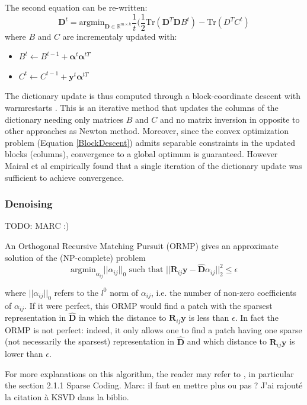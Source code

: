 \documentclass{ipol}
\newcommand{\psize}{m}
\newcommand{\dsize}{k}
\newcommand{\dict}{\textbf{D}}
\newcommand{\code}{\bm{\alpha}}
\newcommand{\noi}{\textbf{y}}
\newcommand{\RR}{\mathbb{R}}
\newcommand{\argmin}{\text{argmin}}
\begin{document}
The second equation can be re-written:
\begin{equation}
	\dict^{t}= \argmin_{\dict \in \RR^{\psize \times \dsize}} \frac{1}{t} (\frac{1}{2} \text{Tr}(\dict^T \dict B^t)- \text{Tr}(D^T C^t )
	\label{BlockDescent}
\end{equation}
where $B$ and $C$ are incrementaly updated with:
\begin{itemize}
	\item $B^t \leftarrow B^{t-1} + \code^t \code^{tT}$
	\item $C^t \leftarrow C^{t-1} + \noi^t \code^{tT}$
\end{itemize}
The dictionary update is thus computed through a block-coordinate descent with warmrestarts \cite{BlockDescent}. This is an iterative method that updates the columns of the dictionary needing only matrices $B$ and $C$ and no matrix inversion in opposite to other approaches as Newton method. Moreover, since the convex optimization problem (Equation \eqref{BlockDescent}) admits separable constraints in the updated blocks (columns), convergence to a global optimum is guaranteed. However Mairal et al empirically found that a single iteration of the dictionary update was sufficient to achieve convergence.

\subsubsection{Denoising}
TODO: MARC :)

An Orthogonal Recursive Matching Pursuit (ORMP) gives an approximate solution of the (NP-complete) problem
\begin{equation}
\displaystyle{\argmin_{\alpha_{ij}} ||\alpha_{ij}||_0 \text{ such that } ||\bm{R}_{ij}\bm{y} - \hat{\bm{D}}\alpha_{ij}||_2^2 \leq \epsilon}
\label{eqORMP}
\end{equation}

where $||\alpha_{ij}||_0$ refers to the $l^0$ norm of $\alpha_{ij}$, i.e. the number of non-zero coefficients of $\alpha_{ij}$. If it were perfect, this ORMP would find a patch with the sparsest representation in $\hat{\bm{D}}$ in which the distance to $\bm{R}_{ij}\bm{y}$ is less than $\epsilon$. In fact the ORMP is not perfect: indeed, it only allows one to find a patch having one sparse (not necessarily the sparsest) representation in $\hat{\bm{D}}$ and which distance to $\bm{R}_{ij}\bm{y}$ is lower than $\epsilon$.

For more explanations on this algorithm, the reader may refer to \cite{KSVD}, in particular the section 2.1.1 Sparse Coding.
{\color{red} Marc: il faut en mettre plus ou pas ? J'ai rajout\'e la citation \`a KSVD dans la biblio.}
\end{document}
